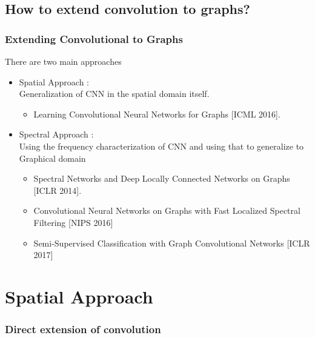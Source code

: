 \documentclass{beamer}
\begin{document}
\subsection{How to extend convolution to graphs?}
\begin{frame}
  \frametitle{Extending Convolutional to Graphs}
  There are two main approaches
  \begin{itemize}
  \item <1->Spatial Approach :\\
    Generalization of CNN in the spatial domain itself.
    \begin{itemize}
    \item <2-> Learning Convolutional Neural Networks for Graphs [ICML 2016].\cite{DBLP:journals/corr/NiepertAK16}
    \end{itemize}
  \item <3-> Spectral Approach :\\
    Using the frequency characterization of CNN and using that to generalize to Graphical domain
    \begin{itemize}
    \item <4->Spectral Networks and Deep Locally Connected Networks on Graphs [ICLR 2014]. %
    \item <4->Convolutional Neural Networks on Graphs with Fast Localized Spectral Filtering [NIPS 2016] %
    \item <4->Semi-Supervised Classification with Graph Convolutional Networks [ICLR 2017] %
    \end{itemize}
  \end{itemize}
\end{frame}

\section{Spatial Approach}
\begin{frame}
  \frametitle{Direct extension of convolution}

\end{frame}

\end{document}
